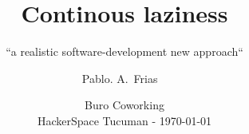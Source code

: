 \title[Tucumán - Argentina] %
{Continous laziness }

\subtitle
{``a realistic software-development new approach``} %

\author[Pablo A. Frias]           %
{
 {Pablo. A.~Frias} \textcolor{black!70}{}
\
}


 \date{ \tiny Buro Coworking \\
    HackerSpace Tucuman  - 
    \textcolor{black!70}{\today}}

\subject{Talks}


